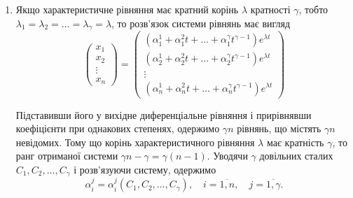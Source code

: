 \begin{enumerate}
\item Якщо характеристичне рівняння має кратний корінь $\lambda$ кратності $\gamma$, тобто $\lambda_1 = \lambda_2 = \ldots = \lambda_\gamma = \lambda$, то розв'язок системи рівнянь має вигляд
\begin{equation*}
	\begin{pmatrix} x_1 \\ x_2 \\ \vdots \\ x_n \end{pmatrix} = \begin{pmatrix} \left(\alpha_1^1 + \alpha_1^2 t + \ldots + \alpha_1^\gamma t^{\gamma - 1}\right) e^{\lambda t} \\ \left(\alpha_2^1 + \alpha_2^2 t + \ldots + \alpha_2^\gamma t^{\gamma - 1}\right) e^{\lambda t} \\ \vdots \\ \left(\alpha_n^1 + \alpha_n^2 t + \ldots + \alpha_n^\gamma t^{\gamma - 1}\right) e^{\lambda t} \end{pmatrix}
\end{equation*}

Підставивши його у вихідне диференціальне рівняння і прирівнявши коефіцієнти при однакових степенях, одержимо $\gamma n$ рівнянь, що містять $\gamma n$ невідомих. Тому що корінь характеристичного рівняння $\lambda$ має кратність $\gamma$, то ранг отриманої системи $\gamma n - \gamma = \gamma (n - 1)$. Уводячи $\gamma$ довільних сталих $C_1, C_2, \ldots, C_\gamma$ і розв'язуючи систему, одержимо
\begin{equation*}
	\alpha_i^j = \alpha_i^j(C_1, C_2, \ldots, C_\gamma), \quad i = \overline{1, n}, \quad j = \overline{1, \gamma}.
\end{equation*}
\end{enumerate}